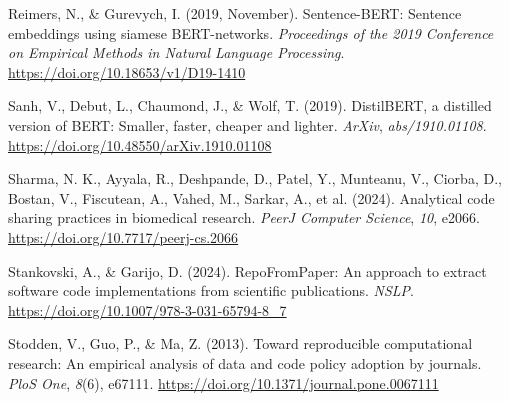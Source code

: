 \documentclass[
  letterpaper,
  DIV=11,
  numbers=noendperiod]{scrartcl}
\newlength{\cslhangindent}
\newenvironment{CSLReferences}[2] %
 {\begin{list}{}{%
  \setlength{\itemindent}{0pt}
  \setlength{\leftmargin}{0pt}
  \setlength{\parsep}{0pt}
  \ifodd #1
   \setlength{\leftmargin}{\cslhangindent}
   \setlength{\itemindent}{-1\cslhangindent}
  \fi
  \setlength{\itemsep}{#2\baselineskip}}}
 {\end{list}}
\begin{document}
\begin{CSLReferences}{1}{0}
Reimers, N., \& Gurevych, I. (2019, November). Sentence-BERT: Sentence
embeddings using siamese BERT-networks. \emph{Proceedings of the 2019
Conference on Empirical Methods in Natural Language Processing}.
\url{https://doi.org/10.18653/v1/D19-1410}

Sanh, V., Debut, L., Chaumond, J., \& Wolf, T. (2019). DistilBERT, a
distilled version of BERT: Smaller, faster, cheaper and lighter.
\emph{ArXiv}, \emph{abs/1910.01108}.
\url{https://doi.org/10.48550/arXiv.1910.01108}

Sharma, N. K., Ayyala, R., Deshpande, D., Patel, Y., Munteanu, V.,
Ciorba, D., Bostan, V., Fiscutean, A., Vahed, M., Sarkar, A., et al.
(2024). Analytical code sharing practices in biomedical research.
\emph{PeerJ Computer Science}, \emph{10}, e2066.
\url{https://doi.org/10.7717/peerj-cs.2066}

Stankovski, A., \& Garijo, D. (2024). RepoFromPaper: An approach to
extract software code implementations from scientific publications.
\emph{NSLP}. \url{https://doi.org/10.1007/978-3-031-65794-8_7}

Stodden, V., Guo, P., \& Ma, Z. (2013). Toward reproducible
computational research: An empirical analysis of data and code policy
adoption by journals. \emph{PloS One}, \emph{8}(6), e67111.
\url{https://doi.org/10.1371/journal.pone.0067111}

\end{CSLReferences}
\end{document}
